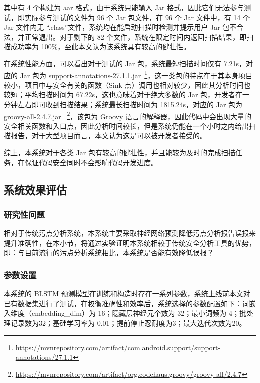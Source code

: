 其中有 4 个构建为 aar 格式，由于系统只能输入 Jar 格式，因此它们无法参与测试，即实际参与测试的文件为 96 个 Jar 包文件，在 96 个 Jar 文件中，有 14 个Jar 文件内无 “.class”文件，系统均在能启动扫描时检测并提示用户 Jar 包不合法，并正常退出。对于剩下的 82 个文件，系统在限定时间内返回扫描结果，即扫描成功率为 100\%，至此本文认为该系统具有较高的健壮性。

在系统性能方面，可以看出对于测试的 Jar 包，系统最短扫描时间仅有 7.21s，对应的 Jar 包为 support-annotations-27.1.1.jar~\footnote{\url{https://mvnrepository.com/artifact/com.android.support/support-annotations/27.1.1}}，这一类包的特点在于其本身项目较小，项目中与安全有关的函数（Sink 点）调用也相对较少，因此其分析时间也较短；平均扫描时间为 67.22s，这也意味着对于绝大多数的 Jar 包，开发者在一分钟左右即可收到扫描结果；系统最长扫描时间为 1815.24s，对应的 Jar 包为 groovy-all-2.4.7.jar ~\footnote{\url{https://mvnrepository.com/artifact/org.codehaus.groovy/groovy-all/2.4.7}}，该包为 Groovy 语言的解释器，因此代码中会出现大量的安全相关函数和入口点，因此分析时间较长，但是系统仍能在一个小时之内给出扫描报告，对于大型项目而言，本文认为这是可以被开发者接受的。

综上，本系统对于各类 Jar 包有较高的健壮性，并且能较为及时的完成扫描任务，在保证代码安全同时不会影响代码开发进度。\\

\subsection{系统效果评估}

\subsubsection{研究性问题}
相对于传统污点分析系统，本系统主要采取神经网络预测降低污点分析报告误报来提升准确性，在本小节，将通过实验证明本系统相较于传统安全分析工具的优势，即：与目前流行的污点分析系统相比，本系统是否能有效降低误报？

\subsubsection{参数设置}
本系统的 BLSTM 预测模型在训练和构造时存在一系列参数，系统上线前本文对已有数据集进行了测试，在权衡准确性和效率后，系统选择的参数配置如下：词嵌入维度（embedding\_dim）为 16；隐藏层神经元个数为 32；最小词频为 4；批处理记录数为32；基础学习率为 0.01；提前停止忍耐度为3；最大迭代次数为20。\\


